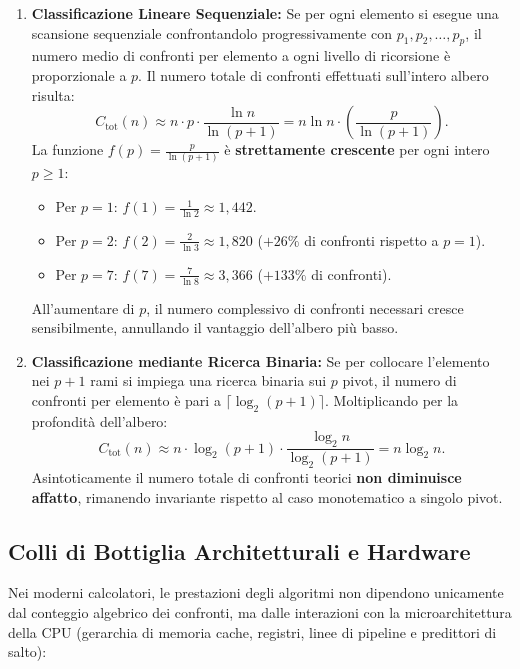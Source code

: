 \begin{enumerate}
  \item \textbf{Classificazione Lineare Sequenziale:}
  Se per ogni elemento si esegue una scansione sequenziale confrontandolo progressivamente con $p_1, p_2, \dots, p_p$, il numero medio di confronti per elemento a ogni livello di ricorsione è proporzionale a $p$. Il numero totale di confronti effettuati sull'intero albero risulta:
  \begin{equation}
    C_{\text{tot}}(n) \approx n \cdot p \cdot \frac{\ln n}{\ln(p + 1)} = n \ln n \cdot \left( \frac{p}{\ln(p + 1)} \right).
  \end{equation}
  La funzione $f(p) = \frac{p}{\ln(p + 1)}$ è \textbf{strettamente crescente} per ogni intero $p \ge 1$:
  \begin{itemize}
    \item Per $p = 1$: $f(1) = \frac{1}{\ln 2} \approx 1{,}442$.
    \item Per $p = 2$: $f(2) = \frac{2}{\ln 3} \approx 1{,}820$ ($+26\%$ di confronti rispetto a $p=1$).
    \item Per $p = 7$: $f(7) = \frac{7}{\ln 8} \approx 3{,}366$ ($+133\%$ di confronti).
  \end{itemize}
  All'aumentare di $p$, il numero complessivo di confronti necessari cresce sensibilmente, annullando il vantaggio dell'albero più basso.

  \item \textbf{Classificazione mediante Ricerca Binaria:}
  Se per collocare l'elemento nei $p+1$ rami si impiega una ricerca binaria sui $p$ pivot, il numero di confronti per elemento è pari a $\lceil \log_2(p + 1) \rceil$. Moltiplicando per la profondità dell'albero:
  \begin{equation}
    C_{\text{tot}}(n) \approx n \cdot \log_2(p + 1) \cdot \frac{\log_2 n}{\log_2(p + 1)} = n \log_2 n.
  \end{equation}
  Asintoticamente il numero totale di confronti teorici \textbf{non diminuisce affatto}, rimanendo invariante rispetto al caso monotematico a singolo pivot.
\end{enumerate}

\subsection{Colli di Bottiglia Architetturali e Hardware}
\label{subsec:hardware-bottlenecks}

Nei moderni calcolatori, le prestazioni degli algoritmi non dipendono unicamente dal conteggio algebrico dei confronti, ma dalle interazioni con la microarchitettura della CPU (gerarchia di memoria cache, registri, linee di pipeline e predittori di salto):

